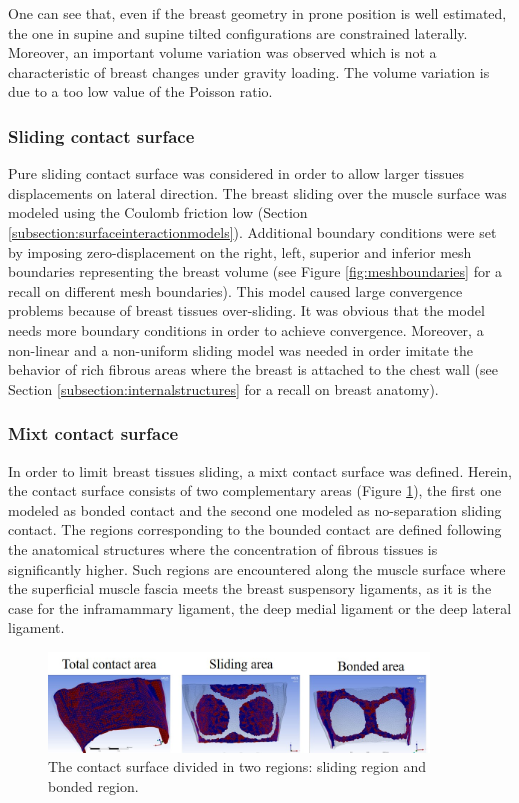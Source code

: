 One can see that, even if the breast geometry in prone position is well estimated, the one in supine and supine tilted configurations are constrained laterally. Moreover, an important volume variation was observed which is not a characteristic of breast changes under gravity loading. The volume variation is due to a too low value of the Poisson ratio. 

\subsubsection*{Sliding contact surface}

Pure sliding contact surface was considered in order to allow larger tissues displacements on lateral direction. The breast sliding over the muscle surface was modeled using the Coulomb friction low (Section \ref{subsection:surfaceinteractionmodels}). Additional boundary conditions were set by imposing zero-displacement on the right, left, superior and inferior mesh boundaries representing the breast volume (see Figure \ref{fig:meshboundaries} for a recall on different mesh boundaries).  This model caused large convergence problems because of breast tissues over-sliding. It was obvious that the model needs more boundary conditions in order to achieve convergence. Moreover, a non-linear and a non-uniform sliding model was needed in order imitate the behavior of rich fibrous areas where the breast is attached to the chest wall (see Section \ref{subsection:internalstructures} for a recall on breast anatomy). 


\subsubsection*{Mixt contact surface}

In order to limit breast tissues sliding, a mixt contact surface was defined. Herein, the contact surface consists of two complementary areas (Figure \ref{fig:mixtcontact}), the first one modeled as bonded contact and the second one modeled as no-separation sliding contact. The regions corresponding to the bounded contact are defined following the anatomical structures where the concentration of fibrous tissues is significantly higher. Such regions are encountered along the muscle surface where the superficial muscle fascia meets the breast suspensory ligaments, as it is the case for the inframammary ligament, the deep medial ligament or the deep lateral ligament.

\begin{figure}[!h]
\centering
\includegraphics[width=0.9\textwidth,keepaspectratio]{figures/mixtcontactarea.jpg} 
\caption{The contact surface divided in two regions: sliding region and bonded region.}
\label{fig:mixtcontact}
\end{figure}


